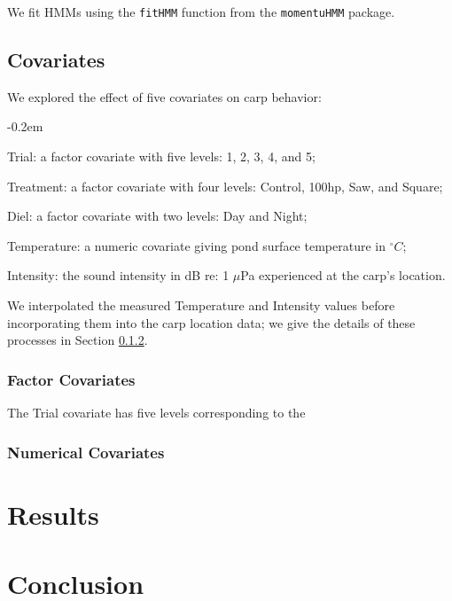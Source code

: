 \documentclass[12pt]{article}
\begin{document}
		We fit HMMs using the \texttt{fitHMM} function from the \texttt{momentuHMM} package.
	
	\subsection{Covariates}
	
		We explored the effect of five covariates on carp behavior:
		
		\begin{nicelist}
			\itemsep-0.2em
			\item Trial: a factor covariate with five levels: 1, 2, 3, 4, and 5;
			\item Treatment: a factor covariate with four levels: Control, 100hp, Saw, and Square;
			\item Diel: a factor covariate with two levels: Day and Night;
			\item Temperature: a numeric covariate giving pond surface temperature in $^\circ C$;
			\item Intensity: the sound intensity in dB re: 1 $\mu$Pa experienced at the carp's location.
		\end{nicelist}
	
		We interpolated the measured Temperature and Intensity values before incorporating them into the carp location data; we give the details of these processes in Section \ref{sec:num-cov}.
	
		\subsubsection{Factor Covariates}
		
			The Trial covariate has five levels corresponding to the 
		
		\subsubsection{Numerical Covariates} \label{sec:num-cov}

\section{Results}

\section{Conclusion}



\end{document}
